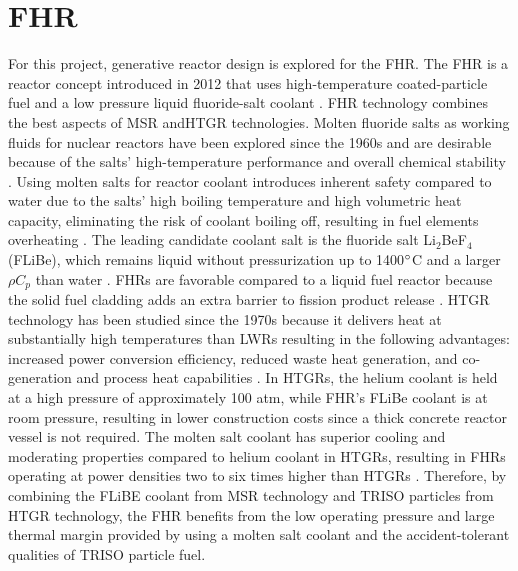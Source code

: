 \section{\gls{FHR}}
For this project, generative reactor design is explored for the 
\gls{FHR}. 
The \gls{FHR} is a reactor concept introduced in 2012 that uses high-temperature 
coated-particle fuel and a low pressure liquid fluoride-salt coolant 
\cite{forsberg_fluoride-salt-cooled_2012,facilitators_fluoride-salt-cooled_2013}.
\gls{FHR} technology combines the best aspects of \gls{MSR} and\gls{HTGR} 
technologies. 
Molten fluoride salts as working fluids for nuclear reactors have been explored 
since the 1960s and are desirable because of the salts' high-temperature 
performance and overall chemical stability \cite{scarlat_design_2014}.  
Using molten salts for reactor coolant introduces inherent safety compared 
to water due to the salts' high boiling temperature and high volumetric 
heat capacity, eliminating the risk of coolant boiling off, resulting in 
fuel elements overheating \cite{ho_molten_2013}. 
The leading candidate coolant salt is the fluoride salt Li$_2$BeF$_4$ (FLiBe), 
which remains liquid without pressurization up to 1400$\degree$C and a larger 
$\rho C_p$ than water \cite{ho_molten_2013,forsberg_fluoride-salt-cooled_2012}. 
\glspl{FHR} are favorable compared to a liquid fuel reactor because the solid 
fuel cladding adds an extra barrier to fission product release 
\cite{ho_molten_2013}.
\gls{HTGR} technology has been studied since the 1970s because it delivers 
heat at substantially high temperatures than \glspl{LWR} resulting in 
the following advantages: increased power conversion efficiency, reduced 
waste heat generation, and co-generation and process heat capabilities 
\cite{scarlat_design_2014}. 
In \glspl{HTGR}, the helium coolant is held at a high pressure of approximately 
100 atm, while \gls{FHR}'s FLiBe coolant is at room pressure, resulting in lower 
construction costs since a thick concrete reactor vessel is not required.
The molten salt coolant has superior cooling and moderating properties compared 
to helium coolant in \glspl{HTGR}, resulting in \glspl{FHR} operating at 
power densities two to six times higher than  \glspl{HTGR} 
\cite{scarlat_design_2014,forsberg_fluoride-salt-cooled_2012}.
Therefore, by combining the FLiBE coolant from \gls{MSR} technology and 
\gls{TRISO} particles from \gls{HTGR} technology, the \gls{FHR} benefits from 
the low operating pressure and large thermal margin provided by using a molten 
salt coolant and the accident-tolerant qualities of \gls{TRISO} particle fuel. 

